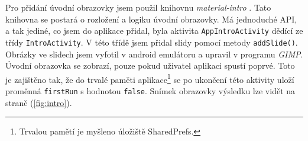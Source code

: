 \documentclass[../TakeYourPill.tex]{subfiles}
\begin{document}
Pro přidání úvodní obrazovky jsem použil knihovnu \textit{material-intro} \cite{intro}. Tato knihovna se postará o rozložení a logiku úvodní obrazovky. Má jednoduché API, a tak jediné, co jsem do aplikace přidal, byla aktivita \texttt{AppIntroActivity} dědící ze třídy \texttt{IntroActivity}. V této třídě jsem přidal slidy pomocí metody \texttt{addSlide()}. Obrázky ve slidech jsem vyfotil v android emulátoru a upravil v programu \textit{GIMP}. Úvodní obrazovka se zobrazí, pouze pokud uživatel aplikaci spustí poprvé. Toto je zajištěno tak, že do trvalé paměti aplikace\footnote{Trvalou pamětí je myšleno úložiště SharedPrefs.} se po ukončení této aktivity uloží proměnná \texttt{firstRun} s hodnotou \texttt{false}. Snímek obrazovky výsledku lze vidět na straně \pageref{fig:intro} (\ref{fig:intro}).
\end{document}
